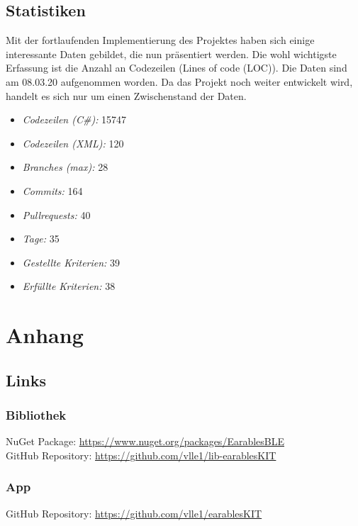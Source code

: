 \documentclass[a4paper,12pt]{article}
\begin{document}
\subsection{Statistiken}
Mit der fortlaufenden Implementierung des Projektes haben sich einige interessante Daten gebildet, die nun präsentiert werden. Die wohl wichtigste Erfassung ist die Anzahl an Codezeilen (Lines of code (LOC)). Die Daten sind am 08.03.20 aufgenommen worden. Da das Projekt noch weiter entwickelt wird, handelt es sich nur um einen Zwischenstand der Daten.
\begin{itemize}
	\item \textit{Codezeilen (C\#): }15747
	\item \textit{Codezeilen (XML): }120
	\item \textit{Branches (max): }28
	\item \textit{Commits: }164
	\item \textit{Pullrequests: }40
	\item \textit{Tage: }35
	\item \textit{Gestellte Kriterien: }39
	\item \textit{Erfüllte Kriterien: }38
\end{itemize}
\section{Anhang}
\subsection{Links}
\subsubsection{Bibliothek}
NuGet Package: \url{https://www.nuget.org/packages/EarablesBLE}\\
GitHub Repository: \url{https://github.com/vlle1/lib-earablesKIT}
\subsubsection{App}
GitHub Repository: \url{https://github.com/vlle1/earablesKIT}


\printglossaries
{}
\end{document}
